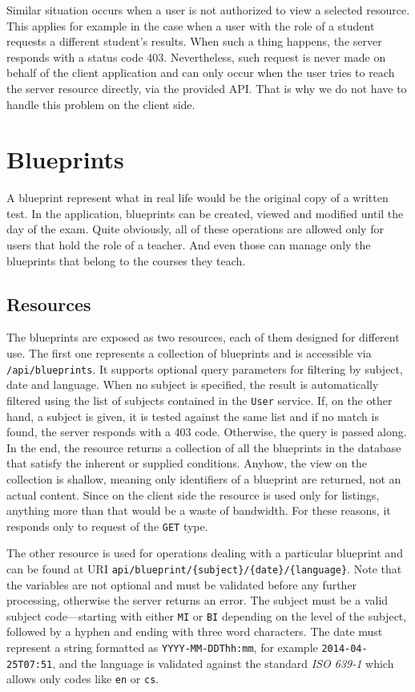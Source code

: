 \documentclass[thesis=M,english,hidelinks]{FITthesis}[2012/10/20]
\newcommand{\code}{\texttt}
\begin{document}
Similar situation occurs when a user is not authorized to view a selected resource. This applies for example in the case when a user with the role of a student requests a different student's results. When such a thing happens, the server responds with a status code 403. Nevertheless, such request is never made on behalf of the client application and can only occur when the user tries to reach the server resource directly, via the provided API. That is why we do not have to handle this problem on the client side.

\section{Blueprints}

A blueprint represent what in real life would be the original copy of a written test. In the application, blueprints can be created, viewed and modified until the day of the exam. Quite obviously, all of these operations are allowed only for users that hold the role of a teacher. And even those can manage only the blueprints that belong to the courses they teach.

\subsection{Resources}

The blueprints are exposed as two resources, each of them designed for different use. The first one represents a collection of blueprints and is accessible via \code{/api/blueprints}. It supports optional query parameters for filtering by subject, date and language. When no subject is specified, the result is automatically filtered using the list of subjects contained in the \code{User} service. If, on the other hand, a subject is given, it is tested against the same list and if no match is found, the server responds with a 403 code. Otherwise, the query is passed along. In the end, the resource returns a collection of all the blueprints in the database that satisfy the inherent or supplied conditions. Anyhow, the view on the collection is shallow, meaning only identifiers of a blueprint are returned, not an actual content. Since on the client side the resource is used only for listings, anything more than that would be a waste of bandwidth. For these reasons, it responds only to request of the \code{GET} type.

The other resource is used for operations dealing with a particular blueprint and can be found at URI \code{api/blueprint/\{subject\}/\{date\}/\{language\}}. Note that the variables are not optional and must be validated before any further processing, otherwise the server returns an error. The subject must be a valid subject code---starting with either \code{MI} or \code{BI} depending on the level of the subject, followed by a hyphen and ending with three word characters. The date must represent a string formatted as \code{YYYY-MM-DDThh:mm}, for example \code{2014-04-25T07:51}, and the language is validated against the standard \textit{ISO 639-1} which allows only codes like \code{en} or \code{cs}.
\end{document}
